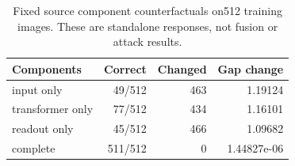 \begin{table}[t]
\centering
\small
\begin{tabular}{lrrr}
\toprule
Components & Correct & Changed & Gap change \\
\midrule
input only & 49/512 & 463 & 1.19124 \\
transformer only & 77/512 & 434 & 1.16101 \\
readout only & 45/512 & 466 & 1.09682 \\
complete & 511/512 & 0 & 1.44827e-06 \\
\bottomrule
\end{tabular}
\caption{Fixed source component counterfactuals on512 training images. These are standalone responses, not fusion or attack results.}
\label{tab:coordinate-components}
\end{table}
